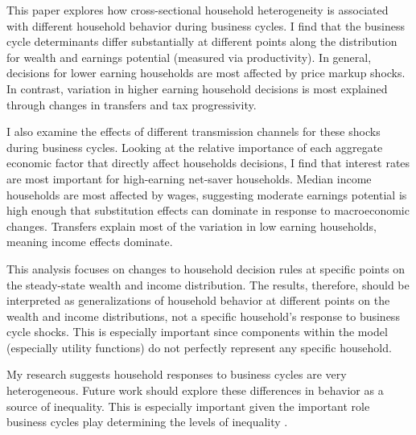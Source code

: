 This paper explores how cross-sectional household heterogeneity is associated with different household behavior during business cycles. I find that the business cycle determinants differ substantially at different points along the distribution for wealth and earnings potential (measured via productivity). In general, decisions for lower earning households are most affected by price markup shocks. In contrast, variation in higher earning household decisions is most explained through changes in transfers and tax progressivity. 

I also examine the effects of different transmission channels for these shocks during business cycles. Looking at the relative importance of each aggregate economic factor that directly affect households decisions, I find that interest rates are most important for high-earning net-saver households. Median income households are most affected by wages, suggesting moderate earnings potential is high enough that substitution effects can dominate in response to macroeconomic changes. Transfers explain most of the variation in low earning households, meaning income effects dominate.

This analysis focuses on changes to household decision rules at specific points on the steady-state wealth and income distribution. The results, therefore, should be interpreted as generalizations of household behavior at different points on the wealth and income distributions, not a specific household's response to business cycle shocks. This is especially important since components within the model (especially utility functions) do not perfectly represent any specific household. 

My research suggests household responses to business cycles are very heterogeneous. Future work should explore these differences in behavior as a source of inequality. This is especially important given the important role business cycles play determining the levels of inequality \autocite{bayer2024shocks}.
